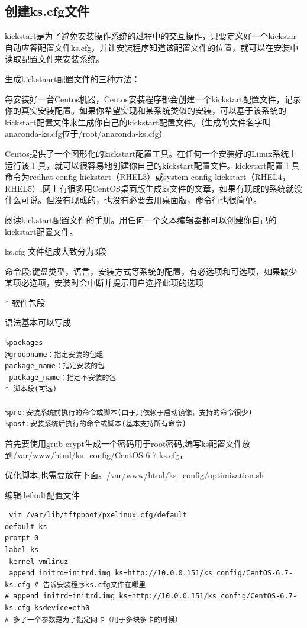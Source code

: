 \subsection{创建ks.cfg文件}
kickstart是为了避免安装操作系统的过程中的交互操作，只要定义好一个kickstar自动应答配置文件ks.cfg，并让安装程序知道该配置文件的位置，就可以在安装中读取配置文件来安装系统。

生成kickstaart配置文件的三种方法：

每安装好一台Centos机器，Centos安装程序都会创建一个kickstart配置文件，记录你的真实安装配置。如果你希望实现和某系统类似的安装，可以基于该系统的kickstart配置文件来生成你自己的kickstart配置文件。（生成的文件名字叫anaconda-ks.cfg位于/root/anaconda-ks.cfg）

Centos提供了一个图形化的kickstart配置工具。在任何一个安装好的Linux系统上运行该工具，就可以很容易地创建你自己的kickstart配置文件。kickstart配置工具命令为redhat-config-kickstart（RHEL3）或system-config-kickstart（RHEL4，RHEL5）.网上有很多用CentOS桌面版生成ks文件的文章，如果有现成的系统就没什么可说。但没有现成的，也没有必要去用桌面版，命令行也很简单。

阅读kickstart配置文件的手册。用任何一个文本编辑器都可以创建你自己的kickstart配置文件。

ks.cfg 文件组成大致分为3段

命令段:键盘类型，语言，安装方式等系统的配置，有必选项和可选项，如果缺少某项必选项，安装时会中断并提示用户选择此项的选项

* 软件包段

语法基本可以写成

\begin{lstlisting}
%packages
@groupname：指定安装的包组
package_name：指定安装的包
-package_name：指定不安装的包
* 脚本段(可选)

%pre:安装系统前执行的命令或脚本(由于只依赖于启动镜像，支持的命令很少)
%post:安装系统后执行的命令或脚本(基本支持所有命令)
\end{lstlisting}

首先要使用grub-crypt生成一个密码用于root密码,编写ks配置文件放到/var/www/html/ks_config/CentOS-6.7-ks.cfg，

%

优化脚本,也需要放在下面。/var/www/html/ks_config/optimization.sh

%

编辑default配置文件

\begin{lstlisting}
 vim /var/lib/tftpboot/pxelinux.cfg/default
default ks
prompt 0
label ks
 kernel vmlinuz
 append initrd=initrd.img ks=http://10.0.0.151/ks_config/CentOS-6.7-ks.cfg # 告诉安装程序ks.cfg文件在哪里
# append initrd=initrd.img ks=http://10.0.0.151/ks_config/CentOS-6.7-ks.cfg ksdevice=eth0
# 多了一个参数是为了指定网卡（用于多块多卡的时候）
\end{lstlisting}

